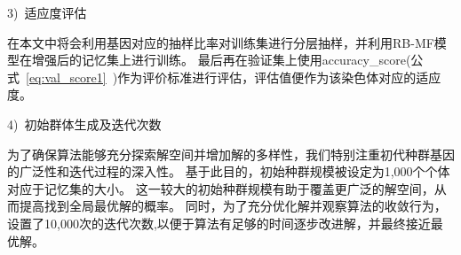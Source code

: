 3)~适应度评估\par
在本文中将会利用基因对应的抽样比率对训练集进行分层抽样，并利用RB-MF模型在增强后的记忆集上进行训练。
最后再在验证集上使用accuracy\_score(公式~\ref{eq:val_score1}~)作为评价标准进行评估，评估值便作为该染色体对应的适应度。\par

4)~初始群体生成及迭代次数\par
为了确保算法能够充分探索解空间并增加解的多样性，我们特别注重初代种群基因的广泛性和迭代过程的深入性。
基于此目的，初始种群规模被设定为1,000个个体对应于记忆集的大小。
这一较大的初始种群规模有助于覆盖更广泛的解空间，从而提高找到全局最优解的概率。
同时，为了充分优化解并观察算法的收敛行为，设置了10,000次的迭代次数,以便于算法有足够的时间逐步改进解，并最终接近最优解。\par

